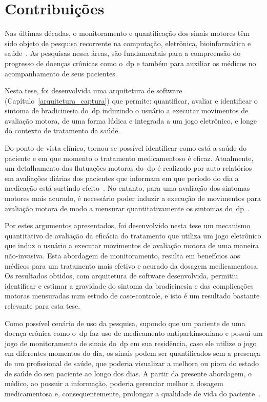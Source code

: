 \section{Contribuições}
Nas últimas décadas, o monitoramento e quantificação dos sinais motores têm sido objeto de pesquisa recorrente na computação, eletrônica, bioinformática e saúde~\cite{reviewassesenspark2015}. As pesquisas nessa áreas, são fundamentais para a compreensão do progresso de doenças crônicas como o~\ac{dp} e também para auxiliar os médicos no acompanhamento de seus pacientes.

Nesta tese, foi desenvolvida uma arquitetura de software (Capítulo~\ref{arquitetura_captura}) que permite: quantificar, avaliar e identificar o sintoma de bradicinesia do~\ac{dp} induzindo o usuário a executar movimentos de avaliação motora, de uma forma lúdica e integrada a um jogo eletrônico, e longe do contexto de tratamento da saúde.

Do ponto de vista clínico, tornou-se possível identificar como está a saúde do paciente e em que momento o tratamento medicamentoso é eficaz. Atualmente, um detalhamento das flutuações motoras do~\ac{dp} é realizado por auto-relatórios em avaliações diárias dos pacientes que informam em que período do dia a medicação está surtindo efeito~\cite{reviewassesenspark2015}. No entanto, para uma avaliação dos sintomas motores mais acurado, é necessário poder induzir a execução de movimentos para avaliação motora de modo a mensurar quantitativamente os sintomas do~\ac{dp}~\cite{wiiassesspark2016}.

Por estes argumentos apresentados, foi desenvolvido nesta tese um mecanismo quantitativo de avaliação da eficácia do tratamento que utiliza um jogo eletrônico que induz o usuário a executar movimentos de avaliação motora de uma maneira não-invasiva. Esta abordagem de monitoramento, resulta em benefícios aos médicos para um tratamento mais efetivo e acurado da dosagem medicamentosa. Os resultados obtidos, com arquitetura de software desenvolvida, permitiu identificar e estimar a gravidade do sintoma da bradicinesia e das complicações motoras mensuradas num estudo de caso-controle, e isto é um resultado bastante relevante para esta tese.

Como possível cenário de uso da pesquisa, supondo que um paciente de uma doença crônica como o~\ac{dp} faz uso de medicamento antiparkinsoniano e possui um jogo de monitoramento de sinais do~\ac{dp} em sua residência, caso ele utilize o jogo em diferentes momentos do dia, os sinais podem ser quantificados sem a presença de um profissional de saúde, que poderia visualizar a melhora ou piora do estado de saúde do seu paciente ao longo dos dias. A partir da presente abordagem, o médico, ao possuir a informação, poderia gerenciar melhor a dosagem medicamentosa e, consequentemente, prolongar a qualidade de vida do paciente~\cite{abn2010}.

